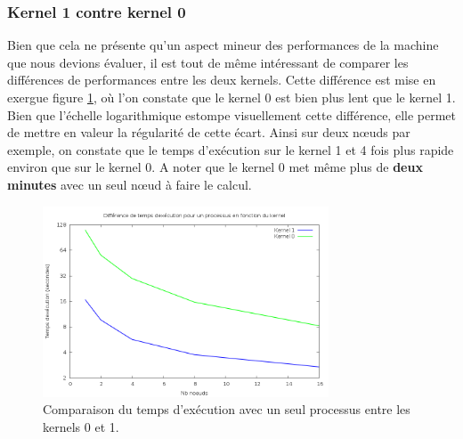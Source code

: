 \documentclass[	DIV=calc,%
							paper=a4,%
							fontsize=11pt,%
							twocolumn]{scrartcl}	 					%
\begin{document}
\subsubsection*{Kernel 1 contre kernel 0}
Bien que cela ne présente qu'un aspect mineur des performances de la machine que nous devions évaluer, il est tout de même intéressant de comparer les différences de performances entre les deux kernels. Cette différence est mise en exergue figure \ref{fig:diff_kern}, où l'on constate que le kernel 0 est bien plus lent que le kernel 1. Bien que l'échelle logarithmique estompe visuellement cette différence, elle permet de mettre en valeur la régularité de cette écart. Ainsi sur deux nœuds par exemple, on constate que le temps d'exécution sur le kernel 1 et 4 fois plus rapide environ que sur le kernel 0.  A noter que le kernel 0 met même plus de \textbf{deux minutes} avec un seul nœud à faire le calcul. 
\begin{figure}
\includegraphics[keepaspectratio,width=8.5cm]{img/diff_kernels.png} 
\caption{Comparaison du temps d'exécution avec un seul processus entre les kernels 0 et 1.}
\label{fig:diff_kern}
\end{figure}
\end{document}
